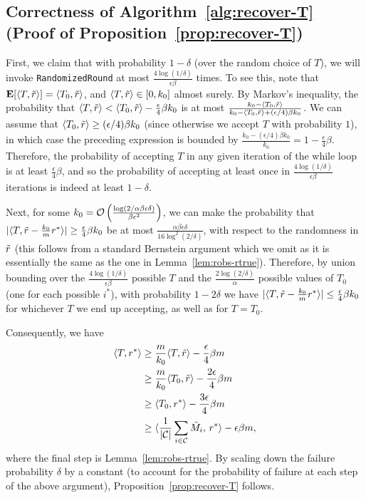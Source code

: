 \subsection{Correctness of Algorithm~\ref{alg:recover-T} (Proof of Proposition~\ref{prop:recover-T})}
\label{sec:recover-T-proof}

First, we claim that with probability $1-\delta$ (over the random choice of $T$), we will invoke 
\texttt{RandomizedRound} at most $\frac{4\log(1/\delta)}{\epsilon\beta}$ times. 
To see this, note that $\mathbf{E}[\langle T, \tilde{r} \rangle] = \langle T_0, \tilde{r} \rangle$, and 
$\langle T, \tilde{r} \rangle \in [0, k_0]$ almost surely. 
By Markov's inequality, the probability that 
$\langle T, \tilde{r} \rangle < \langle T_0, \tilde{r} \rangle - \frac{\epsilon}{4}\beta k_0$ is at most $\frac{k_0 - \langle T_0, \tilde{r} \rangle}{k_0 - \langle T_0, \tilde{r} \rangle + (\epsilon/4)\beta k_0}$. We can assume that 
$\langle T_0, \tilde{r} \rangle \geq (\epsilon/4)\beta k_0$ (since otherwise 
we accept $T$ with probability $1$), in which case the preceding expression 
is bounded by 
$\frac{k_0 - (\epsilon/4)\beta k_0}{k_0} = 1 - \frac{\epsilon}{4}\beta$. 
Therefore, the probability of accepting $T$ in any given iteration of the while 
loop is at least $\frac{\epsilon}{4}\beta$, and so the probability of 
accepting at least once in $\frac{4\log(1/\delta)}{\epsilon\beta}$ iterations is 
indeed at least $1 - \delta$.

Next, for some $k_0 = \mathcal{O}\left( \frac{\log(2/\alpha\beta\epsilon\delta)}{\beta \epsilon^2} \right)$, 
we can make the probability that $|\langle T, \tilde{r} - \frac{k_0}{m}r^* \rangle| \geq \frac{\epsilon}{4} \beta k_0$ be at most $\frac{\alpha\beta\epsilon\delta}{16\log^2(2/\delta)}$, with 
respect to the randomness in $\tilde{r}$ (this follows from a standard Bernstein argument which we omit as it is essentially the same as the one 
in Lemma~\ref{lem:robs-rtrue}). 
Therefore, by union bounding over the $\frac{4\log(1/\delta)}{\epsilon\beta}$ 
possible $T$ and the $\frac{2\log(2/\delta)}{\alpha}$ possible values of $T_0$ (one for each possible $i^*$), 
with probability $1-2\delta$ we have $|\langle T, \tilde{r} - \frac{k_0}{m} r^* \rangle| \leq \frac{\epsilon}{4}\beta k_0$ for whichever $T$ we end up accepting, as well as for $T = T_0$.

Consequently, we have
\begin{align}
\langle T, r^* \rangle &\geq \frac{m}{k_0} \langle T, \tilde{r} \rangle - \frac{\epsilon}{4}\beta m \\
 &\geq \frac{m}{k_0} \langle T_0, \tilde{r} \rangle - \frac{2\epsilon}{4}\beta m \\
 &\geq \langle T_0, r^* \rangle - \frac{3\epsilon}{4}\beta m \\
 &\geq \langle \frac{1}{|\mathcal{C}|} \sum_{i \in \mathcal{C}} \tilde{M}_i,\, r^* \rangle - \epsilon\beta m,
\end{align}
where the final step is Lemma~\ref{lem:robs-rtrue}.
By scaling down the failure probability $\delta$ by a constant 
(to account for the probability of failure at each step of the above argument), 
Proposition~\ref{prop:recover-T} follows.
